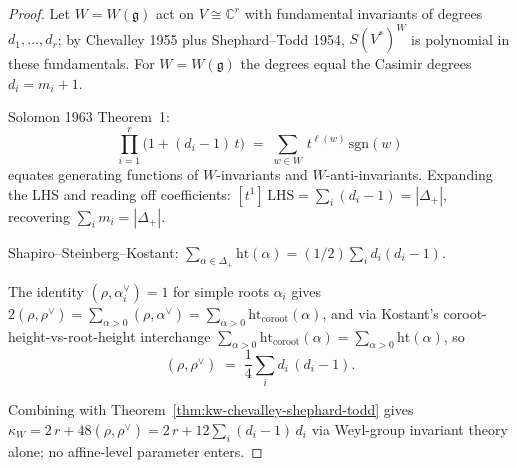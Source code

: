 \documentclass[11pt]{article}
\begin{document}
\begin{proof}
Let $W = W(\mathfrak{g})$ act on $V \cong \mathbb{C}^r$ with fundamental
invariants of degrees $d_1, \dots, d_r$; by Chevalley 1955 plus
Shephard--Todd 1954, $S(V^*)^W$ is polynomial in these fundamentals.
For $W = W(\mathfrak{g})$ the degrees equal the Casimir degrees
$d_i = m_i + 1$.

Solomon 1963 Theorem~1:
\[
  \prod_{i=1}^r \bigl(1 + (d_i - 1)\,t\bigr)
  \;=\;
  \sum_{w \in W}\,t^{\ell(w)}\,\mathrm{sgn}(w)
\]
equates generating functions of $W$-invariants and $W$-anti-invariants.
Expanding the LHS and reading off coefficients:
$[t^1]\,\mathrm{LHS} = \sum_i (d_i - 1) = |\Delta_+|$, recovering
$\sum_i m_i = |\Delta_+|$.

Shapiro--Steinberg--Kostant:
$\sum_{\alpha \in \Delta_+}\mathrm{ht}(\alpha) = (1/2)\sum_i d_i(d_i-1)$.

The identity $(\rho, \alpha_i^{\vee}) = 1$ for simple roots
$\alpha_i$ gives $2(\rho, \rho^{\vee}) = \sum_{\alpha > 0}(\rho, \alpha^{\vee})
= \sum_{\alpha > 0}\mathrm{ht}_{\mathrm{coroot}}(\alpha)$, and via
Kostant's coroot-height-vs-root-height interchange
$\sum_{\alpha > 0}\mathrm{ht}_{\mathrm{coroot}}(\alpha) = \sum_{\alpha > 0}\mathrm{ht}(\alpha)$,
so
\[
  (\rho, \rho^{\vee})
  \;=\;
  \frac{1}{4}\sum_i d_i\,(d_i - 1).
\]

Combining with Theorem~\ref{thm:kw-chevalley-shephard-todd} gives
$\kappa_W = 2\,r + 48(\rho, \rho^{\vee}) = 2\,r + 12\sum_i (d_i-1)\,d_i$
via Weyl-group invariant theory alone; no affine-level parameter
enters.
\end{proof}
\end{document}
